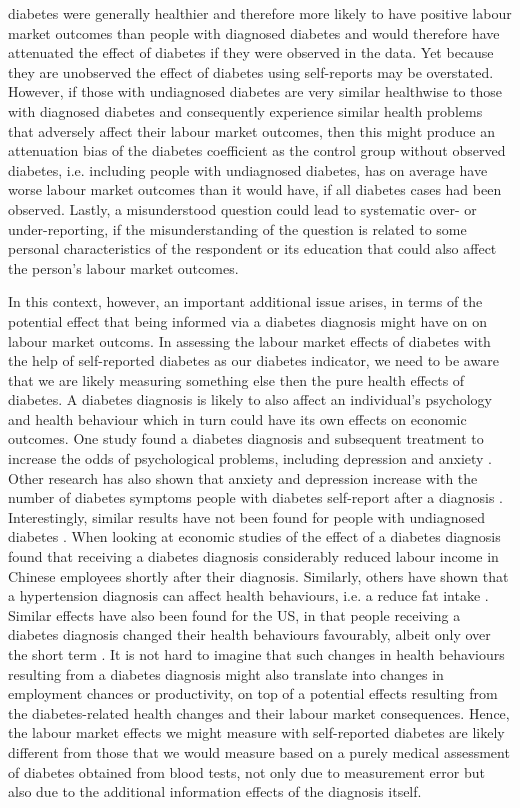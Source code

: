 diabetes were generally healthier and therefore more likely to have
positive labour market outcomes than people with diagnosed diabetes
and would therefore have attenuated the effect of diabetes if they
were observed in the data. Yet because they are unobserved the effect
of diabetes using self-reports may be overstated. However, if those
with undiagnosed diabetes are very similar healthwise to those with
diagnosed diabetes and consequently experience similar health problems
that adversely affect their labour market outcomes, then this might
produce an attenuation bias of the diabetes coefficient as the control
group without observed diabetes, i.e. including people with undiagnosed
diabetes, has on average have worse labour market outcomes than it
would have, if all diabetes cases had been observed. Lastly, a misunderstood
question could lead to systematic over- or under-reporting, if the
misunderstanding of the question is related to some personal characteristics
of the respondent or its education that could also affect the person's
labour market outcomes.

In this context, however, an important additional issue arises, in
terms of the potential effect that being informed via a diabetes diagnosis
might have on on labour market outcoms. In assessing the labour market
effects of diabetes with the help of self-reported diabetes as our
diabetes indicator, we need to be aware that we are likely measuring
something else then the pure health effects of diabetes. A diabetes
diagnosis is likely to also affect an individual's psychology and
health behaviour which in turn could have its own effects on economic
outcomes. One study found a diabetes diagnosis and subsequent treatment
to increase the odds of psychological problems, including depression
and anxiety \citep{17003303}. Other research has also shown that
anxiety and depression increase with the number of diabetes symptoms
people with diabetes self-report after a diagnosis \cite{Paddison_2011}.
Interestingly, similar results have not been found for people with
undiagnosed diabetes \cite{Nouwen_2011}. When looking at economic
studies of the effect of a diabetes diagnosis \citet{Liu2014} found
that receiving a diabetes diagnosis considerably reduced labour income
in Chinese employees shortly after their diagnosis. Similarly, others
have shown that a hypertension diagnosis can affect health
behaviours, i.e. a reduce fat intake \citep{Zhao2013a}. Similar effects have also been found
for the US, in that people receiving a diabetes diagnosis changed
their health behaviours favourably, albeit only over the short term
\citep{Slade2012}. It is not hard to imagine that such changes in
health behaviours resulting from a diabetes diagnosis might also translate
into changes in employment chances or productivity, on top of a potential
effects resulting from the diabetes-related health changes and their
labour market consequences. Hence, the labour market effects we might
measure with self-reported diabetes are likely different from those
that we would measure based on a purely medical assessment of diabetes
obtained from blood tests, not only due to measurement error but also
due to the additional information effects of the diagnosis itself.

